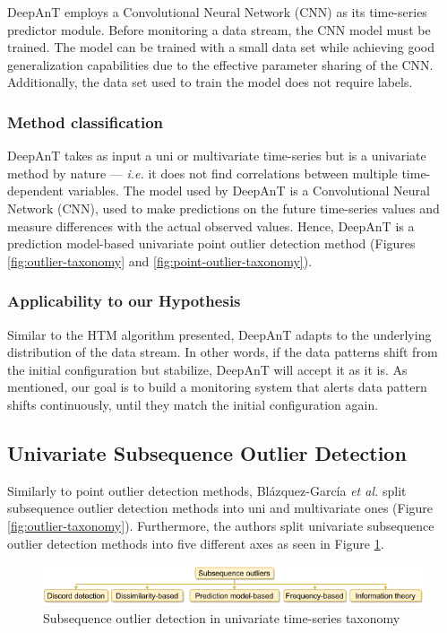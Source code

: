 DeepAnT employs a Convolutional Neural Network (CNN) as its time-series predictor module. Before monitoring a data stream, the CNN model must be trained. The model can be trained with a small data set while achieving good generalization capabilities due to the effective parameter sharing of the CNN. Additionally, the data set used to train the model does not require labels.

\subsubsection*{Method classification}
DeepAnT takes as input a uni or multivariate time-series but is a univariate method by nature --- \textit{i.e.} it does not find correlations between multiple time-dependent variables. The model used by DeepAnT is a Convolutional Neural Network (CNN), used to make predictions on the future time-series values and measure differences with the actual observed values. Hence, DeepAnT is a prediction model-based univariate point outlier detection method (Figures \ref{fig:outlier-taxonomy} and \ref{fig:point-outlier-taxonomy}).

\subsubsection*{Applicability to our Hypothesis}
Similar to the HTM algorithm presented, DeepAnT adapts to the underlying distribution of the data stream. In other words, if the data patterns shift from the initial configuration but stabilize, DeepAnT will accept it as it is. As mentioned, our goal is to build a monitoring system that alerts data pattern shifts continuously, until they match the initial configuration again.

\subsection{Univariate Subsequence Outlier Detection} \label{sec:uni-sub-out}
Similarly to point outlier detection methods, Blázquez-García \emph{et al.} \cite{Blazquez-Garcia-Review-Anomaly-Detection} split subsequence outlier detection methods into uni and multivariate ones (Figure \ref{fig:outlier-taxonomy}). Furthermore, the authors split univariate subsequence outlier detection methods into five different axes as seen in Figure \ref{fig:subsequence-outlier-taxonomy}.

\begin{figure}[!htb]
  \begin{center}
    \includegraphics[scale=0.8]{figures/taxonomy-subsequence-outlier-uni.png}
    \caption[Subsequence outlier detection in univariate time-series taxonomy]{Subsequence outlier detection in univariate time-series taxonomy \cite{Blazquez-Garcia-Review-Anomaly-Detection}}
    \label{fig:subsequence-outlier-taxonomy}
  \end{center}
\end{figure}

